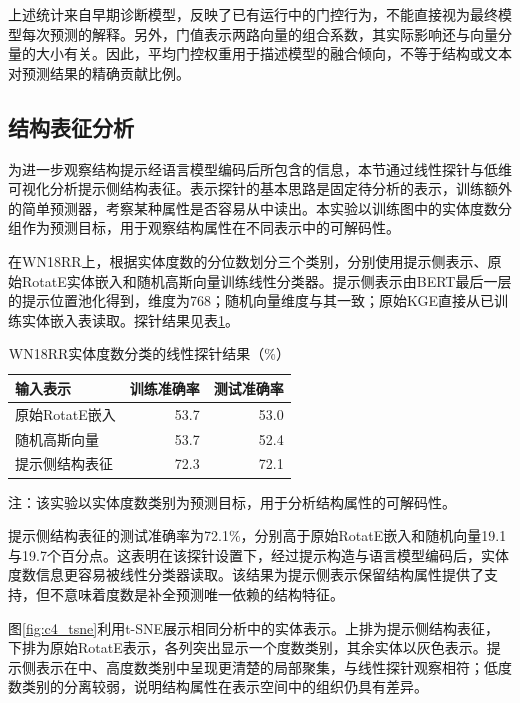 上述统计来自早期诊断模型，反映了已有运行中的门控行为，不能直接视为最终模型每次预测的解释。另外，门值表示两路向量的组合系数，其实际影响还与向量分量的大小有关。因此，平均门控权重用于描述模型的融合倾向，不等于结构或文本对预测结果的精确贡献比例。

\subsection{结构表征分析}

为进一步观察结构提示经语言模型编码后所包含的信息，本节通过线性探针与低维可视化分析提示侧结构表征。表示探针的基本思路是固定待分析的表示，训练额外的简单预测器，考察某种属性是否容易从中读出\cite{hewitt2019structural}。本实验以训练图中的实体度数分组作为预测目标，用于观察结构属性在不同表示中的可解码性。

在WN18RR上，根据实体度数的分位数划分三个类别，分别使用提示侧表示、原始RotatE实体嵌入和随机高斯向量训练线性分类器。提示侧表示由BERT最后一层的提示位置池化得到，维度为768；随机向量维度与其一致；原始KGE直接从已训练实体嵌入表读取。探针结果见表\ref{tab:c4_probe}。

\begin{table}[!htbp]
\centering
{}
\caption{WN18RR实体度数分类的线性探针结果（\%）}
\label{tab:c4_probe}
\begin{tabular}{lrr}
\toprule
输入表示 & 训练准确率 & 测试准确率\\
\midrule
原始RotatE嵌入 & 53.7 & 53.0\\
随机高斯向量 & 53.7 & 52.4\\
提示侧结构表征 & 72.3 & 72.1\\
\bottomrule
\end{tabular}
\par\smallskip
\begin{minipage}{0.91\textwidth}\small
注：该实验以实体度数类别为预测目标，用于分析结构属性的可解码性。
\end{minipage}
\end{table}

提示侧结构表征的测试准确率为72.1\%，分别高于原始RotatE嵌入和随机向量19.1与19.7个百分点。这表明在该探针设置下，经过提示构造与语言模型编码后，实体度数信息更容易被线性分类器读取。该结果为提示侧表示保留结构属性提供了支持，但不意味着度数是补全预测唯一依赖的结构特征。

图\ref{fig:c4_tsne}利用t-SNE\cite{vandermaaten2008tsne}展示相同分析中的实体表示。上排为提示侧结构表征，下排为原始RotatE表示，各列突出显示一个度数类别，其余实体以灰色表示。提示侧表示在中、高度数类别中呈现更清楚的局部聚集，与线性探针观察相符；低度数类别的分离较弱，说明结构属性在表示空间中的组织仍具有差异。

